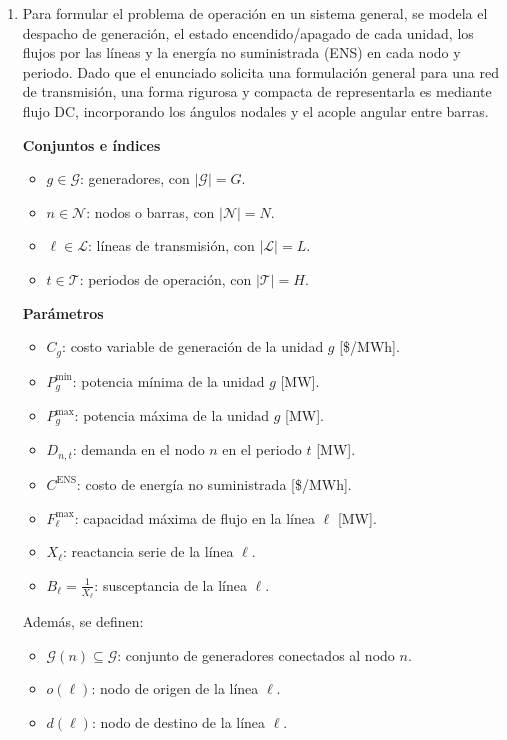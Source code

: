 \begin{enumerate}
De este modo, la formulación representa de mejor forma tanto la física de la red como el costo de no abastecer cargas críticas.

\item

Para formular el problema de operación en un sistema general, se modela el despacho de generación, el estado encendido/apagado de cada unidad, los flujos por las líneas y la energía no suministrada (ENS) en cada nodo y periodo. Dado que el enunciado solicita una formulación general para una red de transmisión, una forma rigurosa y compacta de representarla es mediante flujo DC, incorporando los ángulos nodales y el acople angular entre barras.

\textbf{Conjuntos e índices}
\begin{itemize}
    \item \(g \in \mathcal{G}\): generadores, con \(|\mathcal{G}|=G\).
    \item \(n \in \mathcal{N}\): nodos o barras, con \(|\mathcal{N}|=N\).
    \item \(\ell \in \mathcal{L}\): líneas de transmisión, con \(|\mathcal{L}|=L\).
    \item \(t \in \mathcal{T}\): periodos de operación, con \(|\mathcal{T}|=H\).
\end{itemize}

\textbf{Parámetros}
\begin{itemize}
    \item \(C_g\): costo variable de generación de la unidad \(g\) [\$/MWh].
    \item \(P_g^{\min}\): potencia mínima de la unidad \(g\) [MW].
    \item \(P_g^{\max}\): potencia máxima de la unidad \(g\) [MW].
    \item \(D_{n,t}\): demanda en el nodo \(n\) en el periodo \(t\) [MW].
    \item \(C^{\text{ENS}}\): costo de energía no suministrada [\$/MWh].
    \item \(F_\ell^{\max}\): capacidad máxima de flujo en la línea \(\ell\) [MW].
    \item \(X_\ell\): reactancia serie de la línea \(\ell\).
    \item \(B_\ell = \frac{1}{X_\ell}\): susceptancia de la línea \(\ell\).
\end{itemize}

Además, se definen:
\begin{itemize}
    \item \(\mathcal{G}(n)\subseteq \mathcal{G}\): conjunto de generadores conectados al nodo \(n\).
    \item \(o(\ell)\): nodo de origen de la línea \(\ell\).
    \item \(d(\ell)\): nodo de destino de la línea \(\ell\).
\end{itemize}


\end{enumerate}
